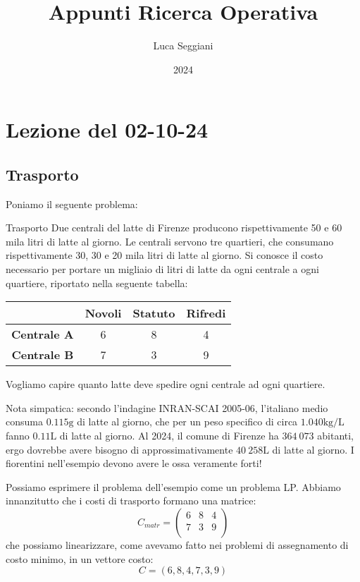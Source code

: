 \documentclass[a4paper,11pt]{article}
\title{Appunti Ricerca Operativa}
\author{Luca Seggiani}
\date{2024}
\begin{document}
\section{Lezione del 02-10-24}

\thispagestyle{empty}
\pagestyle{fancy}

\subsection{Trasporto}
Poniamo il seguente problema:

\begin{problem}{Trasporto}
	Due centrali del latte di Firenze producono	rispettivamente 50 e 60 mila litri di latte al giorno.
	Le centrali servono tre quartieri, che consumano rispettivamente 30, 30 e 20 mila litri di latte al giorno.
	Si conosce il costo necessario per portare un migliaio di litri di latte da ogni centrale a ogni quartiere, riportato nella seguente tabella:
	
	\center{} 
	\begin{tabular} { | c || c | c | c | }
		\hline
		& \bfseries Novoli & \bfseries Statuto & \bfseries Rifredi \\ 
		\hline
		\bfseries Centrale A & 6 & 8 & 4 \\
		\bfseries Centrale B & 7 & 3 & 9 \\
		\hline
	\end{tabular}

	\par\bigskip

	Vogliamo capire quanto latte deve spedire ogni centrale ad ogni quartiere.

	\raggedright
	\par\smallskip

	\tiny{Nota simpatica: secondo l'indagine INRAN-SCAI 2005-06, l'italiano medio consuma $0.115 \mathrm{g}$ di latte al giorno, che per un peso specifico di circa $1.040 \mathrm{kg}/\mathrm{L}$ fanno $0.11 \mathrm{L}$ di latte al giorno. Al 2024, il comune di Firenze ha $364\ 073$ abitanti, ergo dovrebbe avere bisogno di approssimativamente $40\ 258 \mathrm{L}$ di latte al giorno. I fiorentini nell'esempio devono avere le ossa veramente forti!}

\end{problem}

Possiamo esprimere il problema dell'esempio come un problema LP.
Abbiamo innanzitutto che i costi di trasporto formano una matrice:
$$
C_{matr} =
\begin{pmatrix}
6 & 8 & 4 \\
7 & 3 & 9 \\
\end{pmatrix}
$$
che possiamo linearizzare, come avevamo fatto nei problemi di assegnamento di costo minimo, in un vettore costo:
$$
C = (6, 8, 4, 7, 3, 9)
$$
\end{document}
